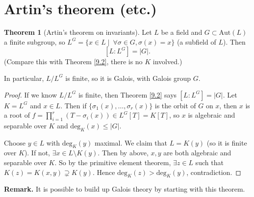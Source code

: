\documentclass{article}
\theoremstyle{definition}
\newtheorem{theorem}{Theorem}[section]
\begin{document}
\section{Artin's theorem (etc.)}


\begin{theorem}[Artin's theorem on invariants]
    Let $L$ be a field and $G \subset \text{Aut}(L)$ a finite subgroup, so $L^G = \{x \in L \mid ~\forall \sigma \in G, \sigma(x)=x\}$ (a subfield of $L$). Then \[
    [L:L^G] = |G|.
    \]
    (Compare this with Theorem \ref{9.2}, there is no $K$ involved.)
    \vspace{1mm}
    
    In particular, $L/L^G$ is finite, so it is Galois, with Galois group $G$.
\end{theorem}
\begin{proof}
    If we know $L/L^G$ is finite, then Theorem \ref{9.2} says $[L:L^G]=|G|$. Let $K=L^G$ and $x \in L$. Then if $\{\sigma_1(x), \ldots, \sigma_r(x)\}$ is the orbit of $G$ on $x$, then $x$ is a root of $f = \prod_{i=1}^{r} (T-\sigma_i(x)) \in L^G[T] = K[T]$, so $x$ is algebraic and separable over $K$ and $\text{deg}_K(x)\le |G|$.
    \vspace{1mm}
    
    Choose $y \in L$ with $\text{deg}_K(y)$ maximal. We claim that $L = K(y)$ (so it is finite over $K$). If not, $\exists x \in L \setminus K(y)$. Then by above, $x, y$ are both algebraic and separable over $K$. So by the primitive element theorem, $\exists z \in L$ such that $K(z)=K(x,y) \supsetneq K(y)$. Hence $\text{deg}_K(z) > \text{deg}_K(y)$, contradiction.
\end{proof}
\textbf{Remark.} It is possible to build up Galois theory by starting with this theorem.
\end{document}
